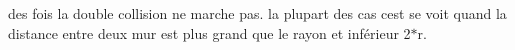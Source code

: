 
\begin{DoxyRefList}
\item[\label{bug__bug000001}%
\Hypertarget{bug__bug000001}%
Membre \mbox{\hyperlink{class_mur_a63a7560c521670716cd90c3599abcd71}{Mur\+:\+:collision}} (\mbox{\hyperlink{class_cercle}{Cercle}} \&) const]des fois la double collision ne marche pas. la plupart des cas c\textquotesingle{}est se voit quand la distance entre deux mur est plus grand que le rayon et inférieur 2$\ast$r.
\end{DoxyRefList}